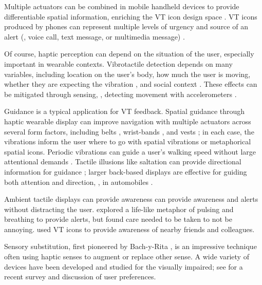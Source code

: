 Multiple actuators can be combined in mobile handheld devices to provide differentiable spatial information, enriching the VT icon design space \cite{Yatani2009a}.
VT icons produced by phones can represent multiple levels of urgency and source of an alert (\eg, voice call, text message, or multimedia message) \cite{Brown2006mobilealerts}.


Of course, haptic perception can depend on the situation of the user, especially important in wearable contexts.
Vibrotactile detection depends on many variables, including location on the user's body, how much the user is moving, whether they are expecting the vibration \cite{Karuei2011}, and social context \cite{Cauchard2016}.
These effects can be mitigated through sensing, \eg, detecting movement with accelerometers \cite{Blum2015}.

Guidance is a typical application for VT feedback.
Spatial guidance through haptic wearable display can improve navigation with multiple actuators across several form factors, including belts \cite{Pielot2009,Lindeman2005}, wrist-bands \cite{Arab2015}, and vests \cite{Prasad2014}; in each case, the vibrations inform the user where to go with spatial vibrations or metaphorical spatial icons.
Periodic vibrations can guide a user's walking speed without large attentional demands \cite{Karuei2014}.
Tactile illusions like saltation can provide directional information for guidance \cite{Tan1997}; larger back-based displays are effective for guiding both attention and direction, \eg, in automobiles \cite{Tan2003}.

Ambient tactile displays can provide awareness can provide awareness and alerts without distracting the user.
\citet{Hemmert2008} explored a life-like metaphor of pulsing and breathing to provide alerts, but found care needed to be taken to not be annoying.
\citet{Brewster2010} used VT icons to provide awareness of nearby friends and colleagues.



Sensory substitution, first pioneered by Bach-y-Rita \cite{Bach-y-Rita1969}, is an impressive technique often using haptic senses to augment or replace other sense.
A wide variety of devices have been developed and studied for the visually impaired; see \citep{Hamilton-Fletcher2016} for a recent survey and discussion of user preferences.


